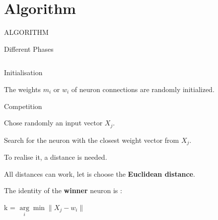 \documentclass{beamer}
\begin{document}
\section{Algorithm}

	\begin{frame}
	
		\begin{center}
			
			\Huge ALGORITHM
		\end{center}
	\end{frame}


	\begin{frame}{Different Phases}

		\begin{columns}

			\begin{column}{0.7\textwidth}

				\begin{block}{Initialisation}

The weights $m_i$ or $w_i$ of neuron connections are randomly initialized.
				\end{block}


				\begin{block}{Competition}
		
Chose randomly an input vector $X_j$. 

Search for the neuron with the closest weight vector from $X_j$.

To realise it, a distance is needed. 

All distances can work, let is choose the \textbf{Euclidean distance}. 

The identity of the \textbf{winner} neuron is : 

					\begin{center}
		
						k = $\arg\limits_{i} \min \| X_j - w_i \|$
					\end{center}
				\end{block}
			\end{column}

			\begin{column}{0.4\textwidth}
				
				\begin{center}
					

\end{center}
\end{column}
\end{columns}
\end{frame}
\end{document}
